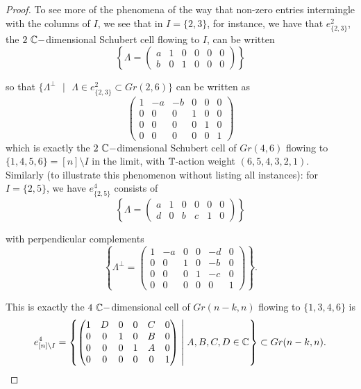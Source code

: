 \documentclass{amsart}
\begin{document}
\begin{proof}
To see more of the phenomena of the way that non-zero entries intermingle with the columns of $I$, we see that in $I = \{2,3\}$, for instance, we have that $e^2_{\{2,3\}}$, the $2 \text{ }\mathbb{C}-$dimensional Schubert cell flowing to $I$, can be written \[ \left\{ \Lambda = \left( \begin{matrix} a & 1 & 0 & 0 & 0 & 0 \\ b & 0 & 1 & 0 & 0 & 0 \end{matrix} \right) \right\}  \]

so that $\{ \Lambda^\perp \text{ }|\text{ } \Lambda \in e^2_{\{2,3\}} \subset Gr(2,6)\}$ can be written as \[ \left( \begin{matrix} 1 & -a & -b & 0 & 0 & 0 \\ 0 &0 &0 &1 &0 &0 \\ 0& 0& 0 &0 &1 &0 \\ 0 &0 &0 &0 &0 &1 \end{matrix}\right) \] which is exactly the $2 \text{ }\mathbb{C}-$dimensional Schubert cell of $Gr(4,6)$ flowing to $\{1,4,5,6\} = [n]\setminus I$ in the limit, with $\mathbb{T}$-action weight $(6,5,4,3,2,1)$. \\

Similarly (to illustrate this phenomenon without listing all instances): for $I=\{2,5\}$, we have $e^4_{\{2,5\}}$ consists of \[ \left\{ \Lambda =  \left( \begin{matrix} a &1 &0 &0 &0 &0\\ d &0 &b &c &1 &0 \end{matrix} \right) \right\} \]

with perpendicular complements \[  \left\{ \Lambda^\perp = \left( \begin{matrix} 1 & -a & 0 &0 &-d &0 \\ 0 &0& 1 &0& -b &0 \\ 0 &0& 0& 1 &-c &0 \\ 0& 0& 0 &0 &0 &1 \end{matrix} \right) \right\}.  \] 

This is exactly the $4 \text{ }\mathbb{C}-$dimensional cell of $Gr(n-k,n)$ flowing to $\{1,3,4,6\}$ is 
\[ e^4_{[n]\setminus I} = \left\{ \left( \begin{matrix} 1 & D & 0 &0 &C &0 \\ 0 &0 &1 &0 &B &0 \\ 0& 0 &0 &1 &A &0 \\ 0& 0& 0& 0& 0& 1 \end{matrix} \right)\;\middle|\; A,B,C,D \in \mathbb{C}  \right\} \subset Gr(n-k,n). \]






    
\end{proof}
\end{document}

